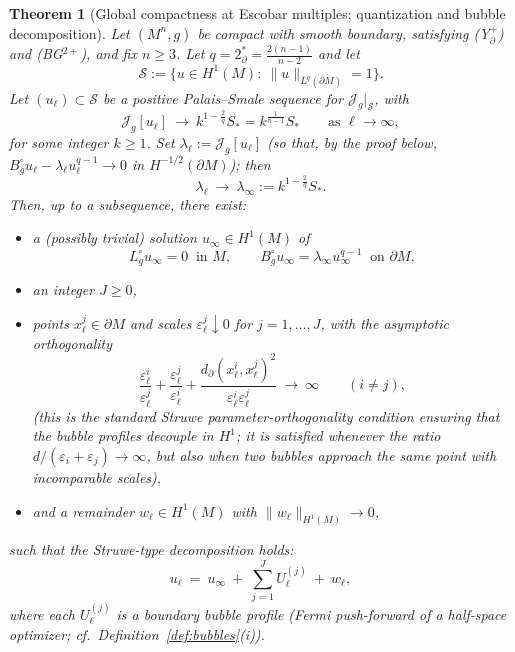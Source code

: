 \documentclass[11pt,reqno,a4paper]{amsart}
\numberwithin{equation}{section}
\theoremstyle{plain}
\newtheorem{theorem}{Theorem}[section]
\theoremstyle{remark}
\theoremstyle{plain}
\begin{document}
\begin{theorem}[Global compactness at Escobar multiples; quantization and bubble decomposition]
\label{thm:global-compactness-kS}
Let $(M^n,g)$ be compact with smooth boundary, satisfying \textup{(Y$^+_{\partial}$)} and \textup{(BG$^{2+}$)}, and fix $n\ge 3$.
Let $q=2^*_{\partial}=\frac{2(n-1)}{n-2}$ and let
\[
\mathcal S:=\Big\{u\in H^1(M):\ \|u\|_{L^q(\partial M)}=1\Big\}.
\]
Let $(u_\ell)\subset \mathcal S$ be a positive Palais--Smale sequence for $\mathcal J_g|_{\mathcal S}$, with
\[
\mathcal J_g[u_\ell]\ \longrightarrow\ k^{1-\frac{2}{q}}S_\ast = k^{\frac1{n-1}}S_\ast
\qquad\text{as }\ell\to\infty,
\]
for some integer $k\ge 1$. Set $\lambda_\ell:=\mathcal J_g[u_\ell]$ (so that, by the proof below, $B_g^\circ u_\ell-\lambda_\ell u_\ell^{q-1}\to0$ in $H^{-1/2}(\partial M)$); then
\[
\lambda_\ell\ \longrightarrow\ \lambda_\infty:=k^{1-\frac{2}{q}}S_\ast.
\]
Then, up to a subsequence, there exist:
\begin{itemize}
\item a (possibly trivial) solution $u_\infty\in H^1(M)$ of
\[
L_g^\circ u_\infty=0 \ \text{ in } M,\qquad B_g^\circ u_\infty=\lambda_\infty u_\infty^{q-1} \ \text{ on } \partial M,
\]
\item an integer $J\ge 0$,
\item points $x_\ell^j\in\partial M$ and scales $\varepsilon_\ell^j\downarrow0$ for $j=1,\dots,J$, with the
\emph{asymptotic orthogonality}
\begin{equation}\label{eq:profile-orthogonality}
\frac{\varepsilon_\ell^i}{\varepsilon_\ell^j}+\frac{\varepsilon_\ell^j}{\varepsilon_\ell^i}
+\frac{d_\partial(x_\ell^i,x_\ell^j)^2}{\varepsilon_\ell^i\varepsilon_\ell^j}\ \longrightarrow\ \infty
\qquad(i\neq j),
\end{equation}
(this is the standard Struwe parameter-orthogonality condition ensuring that the bubble profiles
decouple in $H^1$; it is satisfied whenever the ratio $d/(\varepsilon_i+\varepsilon_j)\to\infty$, but also
when two bubbles approach the same point with incomparable scales),
\item and a remainder $w_\ell\in H^1(M)$ with $\|w_\ell\|_{H^1(M)}\to0$,
\end{itemize}
such that the Struwe-type decomposition holds:
\begin{equation}\label{eq:Esc-struwe-decomp}
u_\ell\ =\ u_\infty\ +\ \sum_{j=1}^{J} U^{(j)}_\ell\ +\ w_\ell,
\end{equation}
where each $U^{(j)}_\ell$ is a boundary bubble profile
(Fermi push-forward of a half-space optimizer; cf.\ Definition~\ref{def:bubbles}(i)).
\smallskip


\end{theorem}
\end{document}
